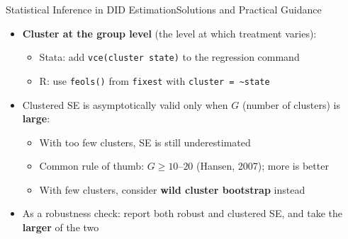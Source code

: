 \documentclass[dvipsnames,hyperref={pdfpagelabels=false}]{beamer}
\begin{document}
\begin{frame}{Statistical Inference in DID Estimation}{Solutions and Practical Guidance}
    \begin{itemize}
        \item \textbf{Cluster at the group level} (the level at which treatment varies):
        \vspace{0.2cm}
        \begin{itemize}
            \item Stata: add \texttt{vce(cluster state)} to the regression command
            \vspace{0.2cm}
            \item R: use \texttt{feols()} from \texttt{fixest} with \texttt{cluster = \textasciitilde state}
        \end{itemize}
        \vspace{0.2cm}
        \item Clustered SE is asymptotically valid only when $G$ (number of clusters) is \textbf{large}:
        \vspace{0.2cm}
        \begin{itemize}
            \item With too few clusters, SE is still underestimated
            \vspace{0.2cm}
            \item Common rule of thumb: $G \geq 10$--$20$ (Hansen, 2007); more is better
            \vspace{0.2cm}
            \item With few clusters, consider \textbf{wild cluster bootstrap} instead
        \end{itemize}
        \vspace{0.2cm}
        \item As a robustness check: report both robust and clustered SE, and take the \textbf{larger} of the two
    \end{itemize}
\end{frame}
\end{document}

